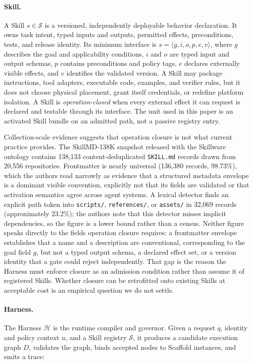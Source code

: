 \documentclass[11pt]{article}
\begin{document}
\paragraph{Skill.}
A Skill $s\in\mathcal{S}$ is a versioned, independently deployable behavior declaration. It owns task intent, typed inputs and outputs, permitted effects, preconditions, tests, and release identity. Its minimum interface is $s=\langle g,i,o,p,e,v\rangle$, where $g$ describes the goal and applicability conditions, $i$ and $o$ are typed input and output schemas, $p$ contains preconditions and policy tags, $e$ declares externally visible effects, and $v$ identifies the validated version. A Skill may package instructions, tool adapters, executable code, examples, and verifier rules, but it does not choose physical placement, grant itself credentials, or redefine platform isolation. A Skill is \textit{operation-closed} when every external effect it can request is declared and testable through its interface. The unit used in this paper is an activated Skill bundle on an admitted path, not a passive registry entry.

Collection-scale evidence suggests that operation closure is not what current practice provides. The SkillMD-138K snapshot released with the Skillware ontology \cite{fan2026skillware} contains 138,133 content-deduplicated \texttt{SKILL.md} records drawn from 20,556 repositories. Frontmatter is nearly universal (136,380 records, 98.73\%), which the authors read narrowly as evidence that a structured metadata envelope is a dominant visible convention, explicitly not that its fields are validated or that activation semantics agree across agent systems. A lexical detector finds an explicit path token into \texttt{scripts/}, \texttt{references/}, or \texttt{assets/} in 32,069 records (approximately 23.2\%); the authors note that this detector misses implicit dependencies, so the figure is a lower bound rather than a census. Neither figure speaks directly to the fields operation closure requires: a frontmatter envelope establishes that a name and a description are conventional, corresponding to the goal field $g$, but not a typed output schema, a declared effect set, or a version identity that a gate could reject independently. That gap is the reason the Harness must enforce closure as an admission condition rather than assume it of registered Skills. Whether closure can be retrofitted onto existing Skills at acceptable cost is an empirical question we do not settle.

\paragraph{Harness.}
The Harness $\mathcal{H}$ is the runtime compiler and governor. Given a request $q$, identity and policy context $u$, and a Skill registry $\mathcal{S}$, it produces a candidate execution graph $D$, validates the graph, binds accepted nodes to Scaffold instances, and emits a trace:
\end{document}
